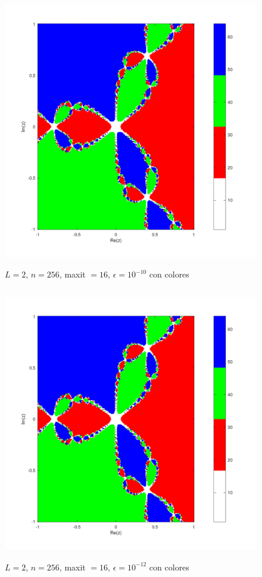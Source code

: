 \documentclass{article} %
\begin{document}
\begin{figure}[H]
    \centering
    \includegraphics[width=152mm, height=120mm]{images/L2n256maxit16e10-10color.png}
    \caption{$L=2$, $n=256$, maxit $=16$, $\epsilon=10^{-10}$ con colores}
\end{figure}

\begin{figure}[H]
    \centering
    \includegraphics[width=152mm, height=120mm]{images/L2n256maxit16e10-12color.png}
    \caption{$L=2$, $n=256$, maxit $=16$, $\epsilon=10^{-12}$ con colores}
\end{figure}
\end{document}
